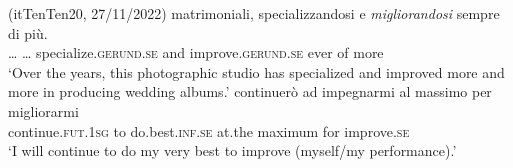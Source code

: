 \documentclass[output=paper,colorlinks,citecolor=brown
]{langscibook}
\begin{document}
\ea (itTenTen20, 27/11/2022) \label{bentley_example_7} 
\ea \label{bentley_example_7a} 
     {matrimoniali,} specializzandosi e \textit{migliorandosi} sempre di più.\\
         {\ldots} {\ldots} specialize.\textsc{gerund}.\textsc{se} and improve.\textsc{gerund}.\textsc{se} ever of more\\
    \glt ‘Over the years, this photographic studio has specialized and improved more and more in producing wedding albums.’
\ex \label{bentley_example_7b}
    \gll  {\ldots}  continuerò ad impegnarmi al massimo per migliorarmi\\
          {}      continue.\textsc{fut}.1\textsc{sg} to do.best.\textsc{inf}.\textsc{se} at.the maximum for improve.\textsc{se}\\
    \glt ‘I will continue to do my very best to improve (myself/my performance).’
    \z
\z
\end{document}
